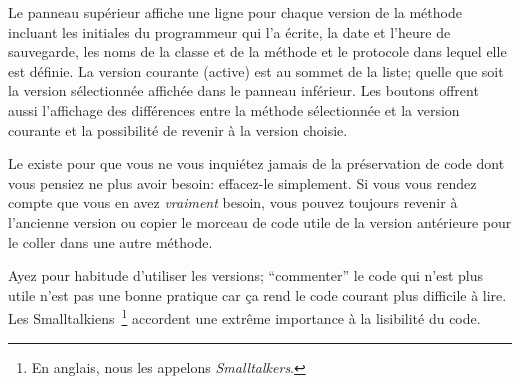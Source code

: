 \documentclass[a4paper,10pt,twoside]{book}
\begin{document}



Le panneau supérieur affiche une ligne pour chaque version de la méthode
incluant les initiales du programmeur qui l'a écrite, la date et l'heure de
sauvegarde, les noms de la classe et de la méthode et le protocole dans 
lequel elle est définie.
La version courante (active) est au sommet de la liste; quelle que soit la version
sélectionnée affichée dans le panneau inférieur.
Les boutons offrent aussi l'affichage des différences entre la méthode sélectionnée et la version courante et la possibilité de revenir à la version choisie.  

Le  existe pour que vous ne vous inquiétez jamais
de la préservation de code dont vous pensiez ne plus avoir besoin: effacez-le simplement. 
Si vous vous rendez compte que vous en avez \emph{vraiment} besoin, 
vous pouvez toujours revenir à l'ancienne version ou copier le morceau de 
code utile de la version antérieure pour le coller dans une autre méthode.

Ayez pour habitude d'utiliser les versions; ``commenter'' le code qui n'est 
plus utile n'est pas une bonne pratique car ça rend le code courant plus difficile à lire. 
Les Smalltalkiens~\footnote{En anglais, nous les appelons
 \emph{Smalltalkers}.} accordent une extrême importance à la lisibilité du code.

\end{document}
